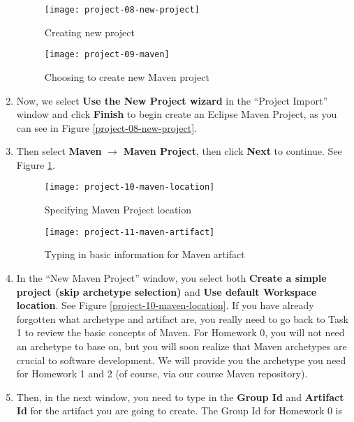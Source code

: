 \begin{enumerate}

\begin{figure}[t]
\hspace{-2em}
\begin{minipage}{0.5\textwidth}
\texttt{[image: project-08-new-project]}
\caption{Creating new project\label{project-08-new-project}}
\end{minipage}
\hfill
\begin{minipage}{0.5\textwidth}
\centering
\texttt{[image: project-09-maven]}
\caption{Choosing to create new Maven project\label{project-09-maven}}
\end{minipage}
\hspace{-2em}
\end{figure}

\item Now, we select \textbf{Use the New Project wizard} in the ``Project Import'' window and click \textbf{Finish} to begin create an Eclipse Maven Project, as you can see in Figure \ref{project-08-new-project}.
\item Then select \textbf{Maven} $\rightarrow$ \textbf{Maven Project}, then click \textbf{Next} to continue. See Figure \ref{project-09-maven}.

\begin{figure}[t]
\hspace{-3em}
\begin{minipage}{0.5\textwidth}
\centering
\texttt{[image: project-10-maven-location]}
\caption{Specifying Maven Project location\label{project-10-maven-location}}
\end{minipage}
\hfill
\begin{minipage}{0.5\textwidth}
\centering
\texttt{[image: project-11-maven-artifact]}
\caption{Typing in basic information for Maven artifact\label{project-11-maven-artifact}}
\end{minipage}
\hspace{-3em}
\end{figure}

\item In the ``New Maven Project'' window, you select both \textbf{Create a simple project (skip archetype selection)} and \textbf{Use default Workspace location}. See Figure \ref{project-10-maven-location}. If you have already forgotten what archetype and artifact are, you really need to go back to Task 1 to review the basic concepts of Maven. For Homework 0, you will not need an archetype to base on, but you will soon realize that Maven archetypes are crucial to software development. We will provide you the archetype you need for Homework 1 and 2 (of course, via our course Maven repository).
\item Then, in the next window, you need to type in the \textbf{Group Id} and \textbf{Artifact Id} for the artifact you are going to create. The Group Id for Homework 0 is


\end{enumerate}
